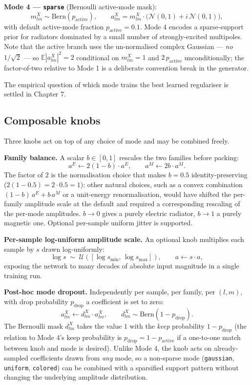 \documentclass[
  english,
  11pt,
]{report}
\begin{document}
\textbf{Mode 4 --- \texttt{sparse}} (Bernoulli active-mode mask): \[
m^X_{lm}\sim\mathrm{Bern}(p_\mathrm{active}),\qquad a^X_{lm} = m^X_{lm}\cdot\bigl(\mathcal N(0,1) + i\,\mathcal N(0,1)\bigr),
\] with default active-mode fraction \(p_\mathrm{active} = 0.1\). Mode 4
encodes a sparse-support prior for radiators dominated by a small number
of strongly-excited multipoles. Note that the active branch uses the
un-normalised complex Gaussian --- \emph{no} \(1/\sqrt 2\) --- so
\(\mathbb E|a^X_{lm}|^2 = 2\) conditional on \(m^X_{lm} = 1\) and
\(2\,p_\mathrm{active}\) unconditionally; the factor-of-two relative to
Mode 1 is a deliberate convention break in the generator.

The empirical question of which mode trains the best learned regulariser
is settled in Chapter 7.

\subsection{Composable knobs}\label{composable-knobs}

Three knobs act on top of any choice of mode and may be combined freely.

\textbf{Family balance.} A scalar \(b \in [0, 1]\) rescales the two
families before packing: \[
a^E \leftarrow 2(1-b)\cdot a^E,\qquad a^M \leftarrow 2b\cdot a^M.
\] The factor of \(2\) is the normalisation choice that makes
\(b = 0.5\) identity-preserving (\(2(1-0.5) = 2\cdot 0.5 = 1\)): other
natural choices, such as a convex combination \((1-b)\,a^E + b\,a^M\) or
a unit-energy renormalisation, would have shifted the per-family
amplitude scale at the default and required a corresponding rescaling of
the per-mode amplitudes. \(b\to 0\) gives a purely electric radiator,
\(b\to 1\) a purely magnetic one. Optional per-sample uniform jitter is
supported.

\textbf{Per-sample log-uniform amplitude scale.} An optional knob
multiplies each sample by \(s\) drawn log-uniformly: \[
\log s\;\sim\;\mathcal U([\log s_{\min},\, \log s_{\max}]),\qquad a \leftarrow s\cdot a,
\] exposing the network to many decades of absolute input magnitude in a
single training run.

\textbf{Post-hoc mode dropout.} Independently per sample, per family,
per \((l,m)\), with drop probability \(p_\mathrm{drop}\) a coefficient
is set to zero: \[
a^X_{lm} \leftarrow d^X_{lm}\cdot a^X_{lm},\qquad d^X_{lm}\sim\mathrm{Bern}(1 - p_\mathrm{drop}).
\] The Bernoulli mask \(d^X_{lm}\) takes the value \(1\) with the
\emph{keep} probability \(1 - p_\mathrm{drop}\) (the relation to Mode
4's keep probability is \(p_\mathrm{drop} = 1 - p_\mathrm{active}\) if a
one-to-one match between knob and mode is desired). Unlike Mode 4, the
knob acts on already-sampled coefficients drawn from \emph{any} mode, so
a non-sparse mode (\texttt{gaussian}, \texttt{uniform},
\texttt{colored}) can be combined with a sparsified support pattern
without changing the underlying amplitude distribution.
\end{document}
